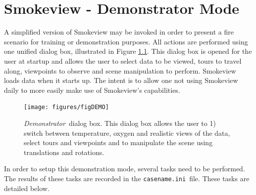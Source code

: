 \documentclass[11pt,twoside]{book}
\newcommand{\figoptions}{hbp}
\begin{document}
\chapter{Smokeview - Demonstrator Mode}
A simplified version of Smokeview may be invoked in order to present a fire
scenario for training or demonstration
purposes.  All actions are performed using one unified dialog box,
illustrated in Figure \ref{figDEMO}.  This dialog box is opened for the
user at startup and allows the user to select data to be viewed, tours to
travel along, viewpoints to observe and scene manipulation to perform.
Smokeview loads data when it starts up.
The intent is to allow one not using Smokeview daily to more easily
make use of Smokeview's capabilities.


\begin{figure}[\figoptions]
\begin{center}
\texttt{[image: figures/figDEMO]}
\end{center}
\caption[{\em Demonstrator}\ dialog box.]{{\em Demonstrator}\ dialog box.
This dialog box allows the user to 1) switch between temperature, oxygen and realistic views of the data,
select tours and viewpoints
 and to manipulate the scene using translations and rotations.} \label{figDEMO}
\end{figure}

In order to setup this demonstration mode, several tasks need to be performed.  The results of these tasks are
recorded in the {\tt casename.ini}\ file.
These tasks are detailed below.
\end{document}

